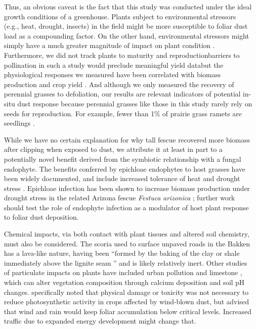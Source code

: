 \documentclass{svjour3}
\begin{document}
Thus, an obvious caveat is the fact that this study was conducted under the ideal growth conditions of a greenhouse. 
Plants subject to environmental stressors (e.g., heat, drought, insects) in the field might be more susceptible to foliar dust load as a compounding factor. 
On the other hand, environmental stressors might simply have a much greater magnitude of impact on plant condition \citep{matsuki2016}. 
Furthermore, we did not track plants to maturity and reproduction\textemdash barriers to pollination in such a study would preclude meaningful yield data\textemdash but the physiological responses we measured have been correlated with biomass production and crop yield \citep[e.g.,][]{fischer1998, zia-khan2014}. 
And although we only measured the recovery of perennial grasses to defoliation, our results are relevant indicators of potential in-situ dust response because perennial grasses like those in this study rarely rely on seeds for reproduction. 
For example, fewer than 1\% of prairie grass ramets are seedlings \citep{benson2006}. 
 
While we have no certain explanation for why tall fescue recovered more biomass after clipping when exposed to dust, we attribute it at least in part to a potentially novel benefit derived from the symbiotic relationship with a fungal endophyte. 
The benefits conferred by epichloae endophytes to host grasses have been widely documented, and include increased tolerance of heat and drought stress \cite{gibert2012,he2013}. 
Epichloae infection has been shown to increase biomass production under drought stress in the related Arizona fescue \emph{Festuca arizonica} \citep{morse2002}; further work should test the role of endophyte infection as a modulator of host plant response to foliar dust deposition. 

Chemical impacts, via both contact with plant tissues and altered soil chemistry, must also be considered. 
The scoria used to surface unpaved roads in the Bakken has a lava-like nature, having been ``formed by the baking of the clay or shale immediately above the lignite seam \citep[][p.435]{roe1950}'' and is likely relatively inert. 
Other studies of particulate impacts on plants have included urban pollution \citep{bao2015} and limestone \citep{brown2009, organiscak2004}, which can alter vegetation composition through calcium deposition and soil pH changes. 
\citet{armbrust1986} specifically noted that physical damage or toxicity was not necessary to reduce photosynthetic activity in crops affected by wind-blown dust, but advised that wind and rain would keep foliar accumulation below critical levels. 
Increased traffic due to expanded energy development might change that.
\end{document}
